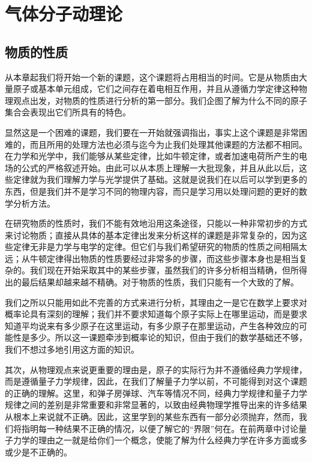 \chapter{气体分子动理论}

\section{物质的性质}

从本章起我们将开始一个新的课题，这个课题将占用相当的时间。它是从物质由大量原子或基本单元组成，它们之间存在着电相互作用，并且从遵循力学定律这种物理观点出发，对物质的性质进行分析的第一部分。我们企图了解为什么不同的原子集合会表现出它们所具有的特色。

显然这是一个困难的课题，我们要在一开始就强调指出，事实上这个课题是非常困难的，而且所用的处理方法也必须与迄今为止我们处理其他课题的方法都不相同。在力学和光学中，我们能够从某些定律，比如牛顿定律，或者加速电荷所产生的电场的公式的严格叙述开始。由此可以从本质上理解一大批现象，并且从此以后，这些定律就为我们理解力学与光学提供了基础。这就是说我们在以后可以学到更多的东西，但是我们并不是学习不同的物理内容，而只是学习用以处理问题的更好的数学分析方法。

在研究物质的性质时，我们不能有效地沿用这条途径，只能以一种非常初步的方式来讨论物质；直接从具体的基本定律出发来分析这样的课题是非常复杂的，因为这些定律无非是力学与电学的定律。但它们与我们希望研究的物质的性质之间相隔太远；从牛顿定律得出物质的性质要经过非常多的步骤，而这些步骤本身也是相当复杂的。我们现在开始采取其中的某些步骤，虽然我们的许多分析相当精确，但所得出的最后结果却越来越不精确。对于物质的性质，我们只能有一个大致的了解。

我们之所以只能用如此不完善的方式来进行分析，其理由之一是它在数学上要求对概率论具有深刻的理解；我们并不要求知道每个原子实际上在哪里运动，而是要求知道平均说来有多少原子在这里运动，有多少原子在那里运动，产生各种效应的可能性是多少。所以这一课题牵涉到概率论的知识，但由于我们的数学基础还不够，我们不想过多地引用这方面的知识。

其次，从物理观点来说更重要的理由是，原子的实际行为并不遵循经典力学规律，而是遵循量子力学规律，因此，在我们了解量子力学以前，不可能得到对这个课题的正确的理解。这里，和弹子房弹球、汽车等情况不同，经典力学规律和量子力学规律之间的差别是非常重要和非常显著的，以致由经典物理学推导出来的许多结果从根本上来说就不正确。因此，这里学到的某些东西有一部分必须抛弃，然而，我们将指明每一种结果不正确的情况，以便了解它的“界限”何在。在前两章中讨论量子力学的理由之一就是给你们一个概念，使能了解为什么经典力学在许多方面或多或少是不正确的。

